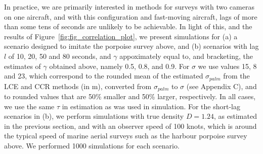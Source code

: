 \documentclass[useAMS, usenatbib, referee]{biom}\usepackage[]{graphicx}\usepackage[]{color}
\begin{document}



In practice, we are primarily interested in methods for surveys with two cameras on one aircraft, and with this configuration and fast-moving aircraft, lags of more than some tens of seconds are unlikely to be achievable. In light of this, and the results of Figure~\ref{fig:fig_correlation_plot}, we present simulations for (a) a scenario designed to imitate the porpoise survey above, and (b) scenarios with lag $l$ of 10, 20, 50 and 80 seconds, and $\gamma$ appoximately equal to, and bracketing, the estimates of $\gamma$ obtained above, namely 0.5, 0.8, and 0.9. For $\sigma$ we use values 15, 8 and 23, which correspond to the rounded mean of the estimated $\sigma_{palm}$ from the LCE and CCR methods (in m), converted from $\sigma_{palm}$ to $\sigma$ (see Appendix C), and to rounded values that are 50\% smaller and 50\% larger, respectively. In all cases, we use the same $\tau$ in estimation as was used in simulation. For the short-lag scenarios in (b), we perform simulations with true density $D=1.24$, as estimated in the previous section, and with an observer speed of 100 knots, which is around the typical speed of marine aerial surveys such as the harbour porpoise survey above. We performed 1000 simulations for each scenario.
\end{document}
